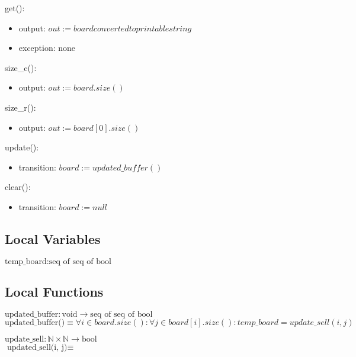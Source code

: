 \documentclass[12pt]{article}
\begin{document}
\noindent get():
\begin{itemize}
\item output: $out := board converted to printable string$
\item exception: none
\end{itemize}

\noindent size\_c():
\begin{itemize}
\item output:  $out := board.size()$

\end{itemize}

\noindent size\_r():
\begin{itemize}
\item output: $out := board[0].size()$

\end{itemize}

\noindent update():
\begin{itemize}
\item transition: $board := updated\_buffer()$
\end{itemize}

\noindent clear():
\begin{itemize}
\item transition: $board := null$
\end{itemize}


\subsection*{Local Variables}

\noindent $\text{temp\_board} : \text{seq of seq of bool}$

\subsection*{Local Functions}

\noindent $\text{updated\_buffer} : \text{void} \rightarrow \text{seq of seq of bool}$\\
\noindent $\text{updated\_buffer()} \equiv \forall i \in board.size() : \forall j \in board[i].size() : temp\_board = update\_sell(i ,j)$

\noindent $\text{update\_sell} : \mathbb{N} \times \mathbb{N} \rightarrow \text{bool}$\\
\noindent $\text{updated\_sell(i, j)} \equiv $
\end{document}
